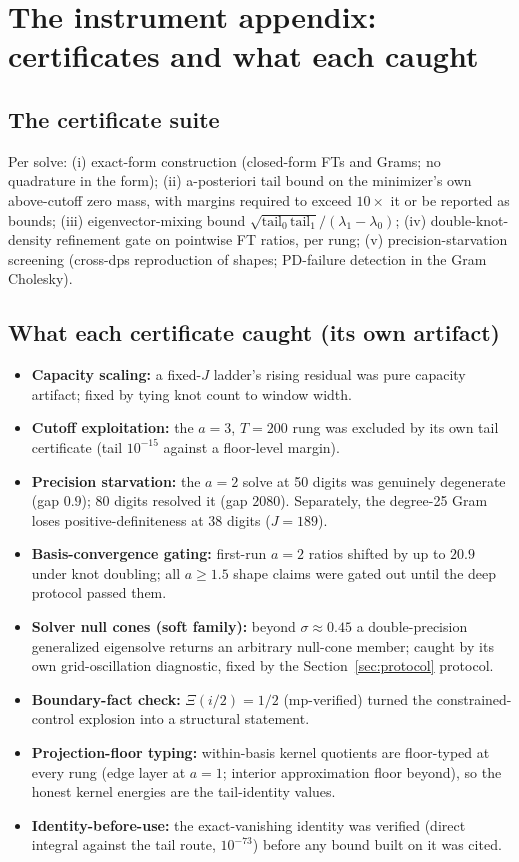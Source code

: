 \documentclass[10pt]{article}
\begin{document}
\section{The instrument appendix: certificates and what each caught}\label{sec:appendix}

\subsection{The certificate suite}\label{sec:suite}

Per solve: (i) exact-form construction (closed-form FTs and Grams; no quadrature in the form); (ii) a-posteriori tail bound on the minimizer's own above-cutoff zero mass, with margins required to exceed $10\times$ it or be reported as bounds; (iii) eigenvector-mixing bound $\sqrt{\mathrm{tail}_0\,\mathrm{tail}_1}/(\lambda_1-\lambda_0)$; (iv) double-knot-density refinement gate on pointwise FT ratios, per rung; (v) precision-starvation screening (cross-dps reproduction of shapes; PD-failure detection in the Gram Cholesky).

\subsection{What each certificate caught (its own artifact)}\label{sec:caught}

\begin{itemize}
\item \textbf{Capacity scaling:} a fixed-$J$ ladder's rising residual was pure capacity artifact; fixed by tying knot count to window width.
\item \textbf{Cutoff exploitation:} the $a = 3$, $T = 200$ rung was excluded by its own tail certificate (tail $10^{-15}$ against a floor-level margin).
\item \textbf{Precision starvation:} the $a = 2$ solve at 50 digits was genuinely degenerate (gap $0.9$); 80 digits resolved it (gap $2080$). Separately, the degree-25 Gram loses positive-definiteness at 38 digits ($J = 189$).
\item \textbf{Basis-convergence gating:} first-run $a = 2$ ratios shifted by up to $20.9$ under knot doubling; all $a \ge 1.5$ shape claims were gated out until the deep protocol passed them.
\item \textbf{Solver null cones (soft family):} beyond $\sigma \approx 0.45$ a double-precision generalized eigensolve returns an arbitrary null-cone member; caught by its own grid-oscillation diagnostic, fixed by the Section~\ref{sec:protocol} protocol.
\item \textbf{Boundary-fact check:} $\Xi(i/2) = 1/2$ (mp-verified) turned the constrained-control explosion into a structural statement.
\item \textbf{Projection-floor typing:} within-basis kernel quotients are floor-typed at every rung (edge layer at $a = 1$; interior approximation floor beyond), so the honest kernel energies are the tail-identity values.
\item \textbf{Identity-before-use:} the exact-vanishing identity was verified (direct integral against the tail route, $10^{-73}$) before any bound built on it was cited.
\end{itemize}
\end{document}
